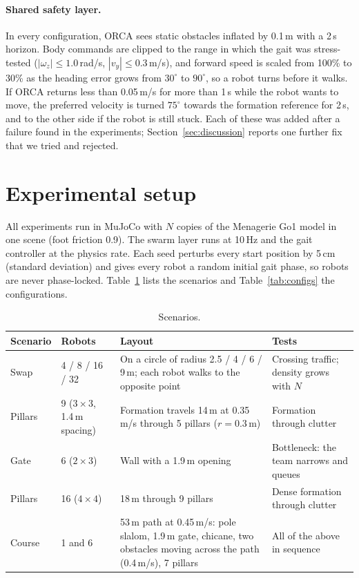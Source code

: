 \paragraph{Shared safety layer.} In every configuration, ORCA sees static obstacles inflated by 0.1\,m with a
2\,s horizon. Body commands are clipped to the range in which the gait was stress-tested
($|\omega_z| \le 1.0$\,rad/s, $|v_y| \le 0.3$\,m/s), and forward speed is scaled from 100\% to 30\% as the
heading error grows from $30^\circ$ to $90^\circ$, so a robot turns before it walks. If ORCA returns less than
0.05\,m/s for more than 1\,s while the robot wants to move, the preferred velocity is turned $75^\circ$
towards the formation reference for 2\,s, and to the other side if the robot is still stuck. Each of these
was added after a failure found in the experiments; Section~\ref{sec:discussion} reports one further fix that
we tried and rejected.

\section{Experimental setup}\label{sec:setup}

All experiments run in MuJoCo \cite{todorov2012mujoco} with $N$ copies of the Menagerie Go1 model
\cite{zakka2022menagerie} in one scene (foot friction 0.9). The swarm layer runs at 10\,Hz and the gait
controller at the physics rate. Each seed perturbs every start position by 5\,cm (standard deviation) and
gives every robot a random initial gait phase, so robots are never phase-locked. Table~\ref{tab:scenarios}
lists the scenarios and Table~\ref{tab:configs} the configurations.

\begin{table}[t]
  \centering
  \caption{Scenarios.}
  \label{tab:scenarios}
  \small
  \begin{tabular}{@{}l p{24mm} p{62mm} p{38mm}@{}}
    \toprule
    Scenario & Robots & Layout & Tests \\
    \midrule
    Swap & 4 / 8 / 16 / 32 & On a circle of radius 2.5 / 4 / 6 / 9\,m; each robot walks to the opposite point & Crossing traffic; density grows with $N$ \\
    Pillars & 9 ($3\times3$, 1.4\,m spacing) & Formation travels 14\,m at 0.35\,m/s through 5 pillars ($r = 0.3$\,m) & Formation through clutter \\
    Gate & 6 ($2\times3$) & Wall with a 1.9\,m opening & Bottleneck: the team narrows and queues \\
    Pillars & 16 ($4\times4$) & 18\,m through 9 pillars & Dense formation through clutter \\
    Course & 1 and 6 & 53\,m path at 0.45\,m/s: pole slalom, 1.9\,m gate, chicane, two obstacles moving across the path (0.4\,m/s), 7 pillars & All of the above in sequence \\
    \bottomrule
  \end{tabular}
\end{table}

